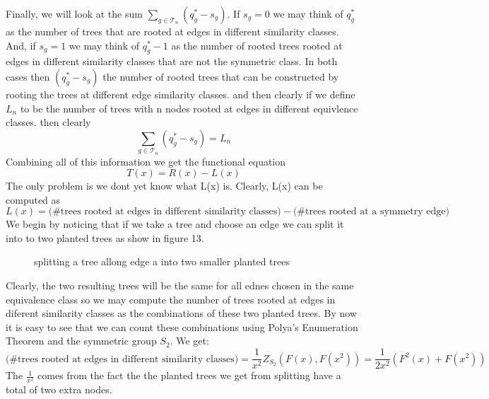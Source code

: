 \documentclass{article}
\begin{document}
Finally, we will look at the sum \(\sum_{g \in \mathscr{T}_n}(q_g^*-s_g)\). If \(s_g=0\) we may think of \(q_g^*\) as the number of trees that are rooted at edges in different similarity classes. And, if \(s_g=1\)  we may think of \(q_g^*-1\) as the number of rooted trees rooted at edges in different similarity classes that are not the symmetric class. In both cases then \((q_g^*-s_g)\) the number of rooted trees that can be constructed by rooting the trees at different edge similarity classes. and then clearly if we define\(L_n\) to be the number of trees with n nodes rooted at edges in different equivlence classes. then clearly 
\begin{equation}
\sum_{g \in \mathscr{T}_n}(q_g^*-s_g)= L_n
\end{equation} 
Combining all of this information we get the functional equation
\begin{equation}
T(x)=R(x)-L(x)
\end{equation}
The only problem is we dont yet know what L(x) is. Clearly, L(x) can be computed as 
\begin{equation}
L(x)=\text{(\# trees rooted at edges in different similarity classes)}-\text{(\# trees rooted at a symmetry edge)}
\end{equation}
We begin by noticing that if we take a tree and choose an edge we can split it into to two planted trees as show in figure 13. 
\begin{figure}[!h]
\centering
{}
\caption{splitting a tree allong edge a into two smaller planted trees}
\end{figure}
 

Clearly, the two resulting trees will be the same for all ednes chosen in the same equivalence class so we may compute the number of trees rooted at edges in diferent similarity classes as the combinations of these two planted trees. By now it is easy to see that we can count these combinations using Polya's Enumeration Theorem and the symmetric group \(S_2\). We get:
\begin{equation}
\text{(\# trees rooted at edges in different similarity classes)}=\frac{1}{x^2}Z_{S_2}(F(x),F(x^2))=\frac{1}{2x^2}(F^2(x)+F(x^2))
\end{equation}
The \(\frac{1}{x^2}\) comes from the fact the the planted trees we get from splitting have a total of two extra nodes. 
\end{document}
